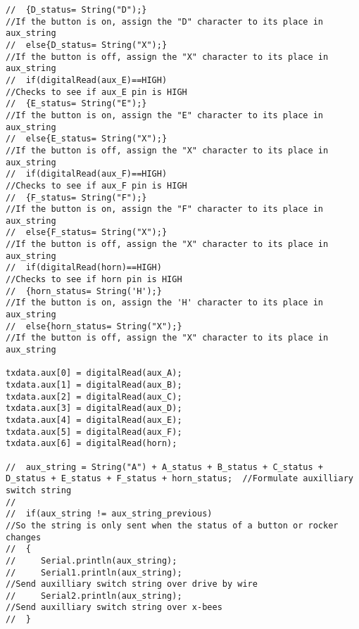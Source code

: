 \begin{lstlisting}[breaklines=true,basicstyle=\tiny]
//  {D_status= String("D");}                                                          //If the button is on, assign the "D" character to its place in aux_string
//  else{D_status= String("X");}                                                      //If the button is off, assign the "X" character to its place in aux_string
//  if(digitalRead(aux_E)==HIGH)                                                      //Checks to see if aux_E pin is HIGH                                                 
//  {E_status= String("E");}                                                          //If the button is on, assign the "E" character to its place in aux_string
//  else{E_status= String("X");}                                                      //If the button is off, assign the "X" character to its place in aux_string
//  if(digitalRead(aux_F)==HIGH)                                                      //Checks to see if aux_F pin is HIGH                                                 
//  {F_status= String("F");}                                                          //If the button is on, assign the "F" character to its place in aux_string
//  else{F_status= String("X");}                                                      //If the button is off, assign the "X" character to its place in aux_string
//  if(digitalRead(horn)==HIGH)                                                       //Checks to see if horn pin is HIGH                                                 
//  {horn_status= String('H');}                                                       //If the button is on, assign the 'H' character to its place in aux_string
//  else{horn_status= String("X");}                                                   //If the button is off, assign the "X" character to its place in aux_string

txdata.aux[0] = digitalRead(aux_A);
txdata.aux[1] = digitalRead(aux_B);
txdata.aux[2] = digitalRead(aux_C);
txdata.aux[3] = digitalRead(aux_D);
txdata.aux[4] = digitalRead(aux_E);
txdata.aux[5] = digitalRead(aux_F);
txdata.aux[6] = digitalRead(horn);

//  aux_string = String("A") + A_status + B_status + C_status + D_status + E_status + F_status + horn_status;  //Formulate auxilliary switch string
//  
//  if(aux_string != aux_string_previous)                                             //So the string is only sent when the status of a button or rocker changes
//  { 
//     Serial.println(aux_string);
//     Serial1.println(aux_string);                                                   //Send auxilliary switch string over drive by wire
//     Serial2.println(aux_string);                                                   //Send auxilliary switch string over x-bees
//  }


\end{lstlisting}
